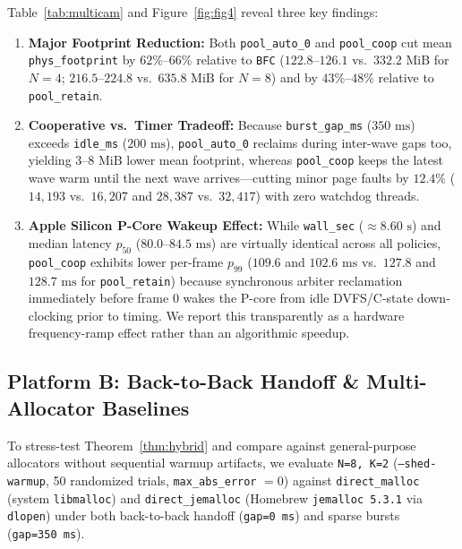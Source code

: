 \documentclass[sigconf,screen]{acmart}
\begin{document}
Table~\ref{tab:multicam} and Figure~\ref{fig:fig4} reveal three key findings:
\begin{enumerate}
  \item \textbf{Major Footprint Reduction:} Both \texttt{pool\_auto\_0} and \texttt{pool\_coop} cut mean \texttt{phys\_footprint} by $62\%\text{--}66\%$ relative to \texttt{BFC} ($122.8\text{--}126.1$ vs.\ $332.2\text{ MiB}$ for $N=4$; $216.5\text{--}224.8$ vs.\ $635.8\text{ MiB}$ for $N=8$) and by $43\%\text{--}48\%$ relative to \texttt{pool\_retain}.
  \item \textbf{Cooperative vs.\ Timer Tradeoff:} Because \texttt{burst\_gap\_ms} ($350\text{ ms}$) exceeds \texttt{idle\_ms} ($200\text{ ms}$), \texttt{pool\_auto\_0} reclaims during inter-wave gaps too, yielding $3\text{--}8\text{ MiB}$ lower mean footprint, whereas \texttt{pool\_coop} keeps the latest wave warm until the next wave arrives---cutting minor page faults by $12.4\%$ ($14{,}193$ vs.\ $16{,}207$ and $28{,}387$ vs.\ $32{,}417$) with zero watchdog threads.
  \item \textbf{Apple Silicon P-Core Wakeup Effect:} While \texttt{wall\_sec} ($\approx 8.60\text{ s}$) and median latency $p_{50}$ ($80.0\text{--}84.5\text{ ms}$) are virtually identical across all policies, \texttt{pool\_coop} exhibits lower per-frame $p_{99}$ ($109.6$ and $102.6\text{ ms}$ vs.\ $127.8$ and $128.7\text{ ms}$ for \texttt{pool\_retain}) because synchronous arbiter reclamation immediately before frame $0$ wakes the P-core from idle DVFS/C-state down-clocking prior to timing. We report this transparently as a hardware frequency-ramp effect rather than an algorithmic speedup.
\end{enumerate}

\subsection{Platform B: Back-to-Back Handoff \& Multi-Allocator Baselines}
To stress-test Theorem~\ref{thm:hybrid} and compare against general-purpose allocators without sequential warmup artifacts, we evaluate \texttt{N=8, K=2} (\texttt{--shed-warmup}, 50 randomized trials, \texttt{max\_abs\_error} $= 0$) against \texttt{direct\_malloc} (system \texttt{libmalloc}) and \texttt{direct\_jemalloc} (Homebrew \texttt{jemalloc 5.3.1} via \texttt{dlopen}) under both back-to-back handoff (\texttt{gap=0~ms}) and sparse bursts (\texttt{gap=350~ms}).
\end{document}
